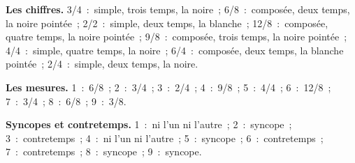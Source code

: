 \textbf{Les chiffres.} 3/4~:~simple, trois temps, la noire~; 6/8~:~composée, deux temps, la noire pointée~; 2/2~:~simple, deux temps, la blanche~; 12/8~:~composée, quatre temps, la noire pointée~; 9/8~:~composée, trois temps, la noire pointée~; 4/4~:~simple, quatre temps, la noire~; 6/4~:~composée, deux temps, la blanche pointée~; 2/4~:~simple, deux temps, la noire.

\textbf{Les mesures.} 1~:~6/8~; 2~:~3/4~; 3~:~2/4~; 4~:~9/8~; 5~:~4/4~; 6~:~12/8~; 7~:~3/4~; 8~:~6/8~; 9~:~3/8.

\textbf{Syncopes et contretemps.} 1~:~ni l'un ni l'autre~; 2~:~syncope~; 3~:~contretemps~; 4~:~ni l'un ni l'autre~; 5~:~syncope~; 6~:~contretemps~; 7~:~contretemps~; 8~:~syncope~; 9~:~syncope.
